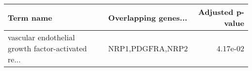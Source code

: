\begin{tabular}{llr}
\toprule
                                         Term name & Overlapping genes... &  Adjusted p-value \\
\midrule
vascular endothelial growth factor-activated re... &     NRP1,PDGFRA,NRP2 &          4.17e-02 \\
\bottomrule
\end{tabular}
